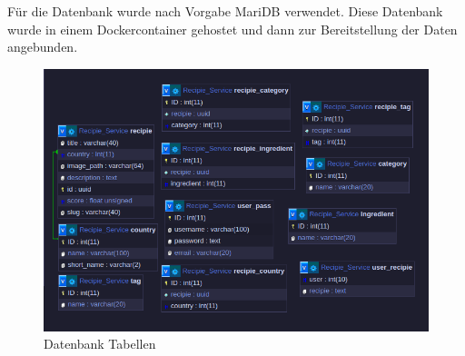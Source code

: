 \documentclass{report}
\begin{document}
Für die Datenbank wurde nach Vorgabe MariDB verwendet. Diese Datenbank wurde in einem Dockercontainer gehostet und dann zur Bereitstellung der Daten angebunden.

\begin{figure}[!hbt]
    \centering
    \includegraphics[scale=0.75]{Pictures/DB_Tables2.png}
    \caption{Datenbank Tabellen}
    \label{fig:sfig1}
\end{figure}
\end{document}
